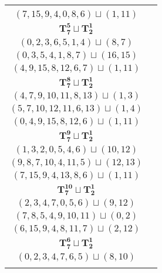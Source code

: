 \documentclass{article}
\begin{document}
\begin{longtable}{|c|c|}
\begin{tabular}{c}
        $(9,12,10,7,5,11,13)\sqcup(1,4)$ \\ 
        $(7,15,9,4,0,8,6)\sqcup(1,11)$
        \end{tabular} \\ 
        \hline
        $\mathbf{T_{7}^{5}} \sqcup \mathbf{T_{2}^{1}}$ & \begin{tabular}{c}
        $(2,4,6,9,12,8,7)\sqcup(11,14)$ \\ 
        $(0,2,3,6,5,1,4)\sqcup(8,7)$ \\ 
        $(0,3,5,4,1,8,7)\sqcup(16,15)$ \\ 
        $(4,9,15,8,12,6,7)\sqcup(1,11)$
        \end{tabular} \\ 
        \hline
        $\mathbf{T_{7}^{8}} \sqcup \mathbf{T_{2}^{1}}$ & \begin{tabular}{c}
        $(1,2,4,6,8,5,9)\sqcup(12,15)$ \\ 
        $(4,7,9,10,11,8,13)\sqcup(1,3)$ \\ 
        $(5,7,10,12,11,6,13)\sqcup(1,4)$ \\ 
        $(0,4,9,15,8,12,6)\sqcup(1,11)$
        \end{tabular} \\ 
        \hline
        $\mathbf{T_{7}^{9}} \sqcup \mathbf{T_{2}^{1}}$ & \begin{tabular}{c}
        $(8,6,4,2,5,9,7)\sqcup(12,14)$ \\ 
        $(1,3,2,0,5,4,6)\sqcup(10,12)$ \\ 
        $(9,8,7,10,4,11,5)\sqcup(12,13)$ \\ 
        $(7,15,9,4,13,8,6)\sqcup(1,11)$
        \end{tabular} \\ 
        \hline
        $\mathbf{T_{7}^{10}} \sqcup \mathbf{T_{2}^{1}}$ & \begin{tabular}{c}
        $(7,6,4,2,8,9,5)\sqcup(12,14)$ \\ 
        $(2,3,4,7,0,5,6)\sqcup(9,12)$ \\ 
        $(7,8,5,4,9,10,11)\sqcup(0,2)$ \\ 
        $(6,15,9,4,8,11,7)\sqcup(2,12)$
        \end{tabular} \\ 
        \hline
        $\mathbf{T_{7}^{6}} \sqcup \mathbf{T_{2}^{1}}$ & \begin{tabular}{c}
        $(2,4,6,8,7,9,12)\sqcup(13,14)$ \\ 
        $(0,2,3,4,7,6,5)\sqcup(8,10)$ \\ 

\end{tabular}
\end{longtable}
\end{document}
